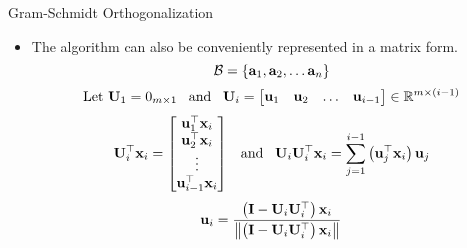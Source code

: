 \documentclass[aspectratio=169]{beamer}
\let\olditem\item
\renewcommand{\item}{\setlength{\itemsep}{\fill}\olditem}
\def\mf{\ensuremath\mathbf}
\def\mb{\ensuremath\mathbb}
\def\mc{\ensuremath\mathcal}
\def\lp{\ensuremath\left(}
\def\rp{\ensuremath\right)}
\begin{document}
\begin{frame}[t]{Gram-Schmidt Orthogonalization}
\vspace{-0.25cm}
\begin{itemize}
    \item The algorithm can also be conveniently represented in a matrix form.
    \[ \mc{B} = \left\{\mf{a}_1, \mf{a}_2, \ldots \mf{a}_n\right\} \]
    \[ \text{Let } \mf{U}_1 = 0_{m \times 1}\,\,\,\text{ and }\,\,\,\mf{U}_i = \begin{bmatrix*}[r]\mf{u}_1 & \mf{u}_2 & \ldots & \mf{u}_{i-1}\end{bmatrix*} \in \mb{R}^{m \times (i - 1)}
    \]
    \[ \mf{U}_i^\top\mf{x}_i = \begin{bmatrix*}[c]\mf{u}_1^\top\mf{x}_i\\\mf{u}_2^\top\mf{x}_i\\\vdots\\\mf{u}_{i-1}^\top\mf{x}_i\\\end{bmatrix*}\,\,\,\text{ and }\,\,\, \mf{U}_i\mf{U}_i^\top\mf{x}_i = \sum_{j=1}^{i-1}\lp \mf{u}_j^\top\mf{x}_i\rp \mf{u}_j
    \]
    \[ \mf{u}_i = \frac{\lp \mf{I} - \mf{U}_i\mf{U}_i^\top\rp \mf{x}_i}{\left\lVert \lp \mf{I} - \mf{U}_i\mf{U}_i^\top\rp \mf{x}_i\right\rVert} \]
\end{itemize}
\end{frame}
\end{document}
